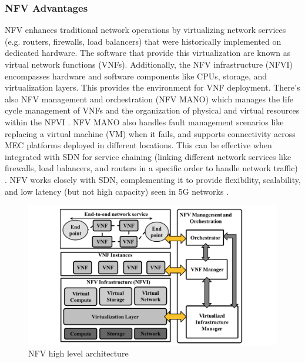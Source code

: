 \documentclass[acmtog]{acmart}
\begin{document}
\subsubsection{NFV Advantages} NFV enhances traditional network operations by virtualizing network services (e.g. routers, firewalls, load balancers) that were historically implemented on dedicated hardware. The software that provide this virtualization are known as virtual network functions (VNFs). Additionally, the NFV infrastructure (NFVI) encompasses hardware and software components like CPUs, storage, and virtualization layers. This provides the environment for VNF deployment. There's also NFV management and orchestration (NFV MANO) which manages the life cycle management of VNFs and the organization of physical and virtual resources within the NFVI \cite{ref6_1}. NFV MANO also handles fault management scenarios like replacing a virtual machine (VM) when it fails, and supports connectivity across MEC platforms deployed in different locations. This can be effective when integrated with SDN for service chaining (linking different network services like firewalls, load balancers, and routers in a specific order to handle network traffic) \cite{ref6_1}. NFV works closely with SDN, complementing it to provide flexibility, scalability, and low latency (but not high capacity) seen in 5G networks \cite{ref6}.
\begin{figure}[h]
  \centering
  \includegraphics[width=\linewidth]{nfv.png}
  \caption{NFV high level architecture \cite{ref7_1}}
\end{figure}
\end{document}
